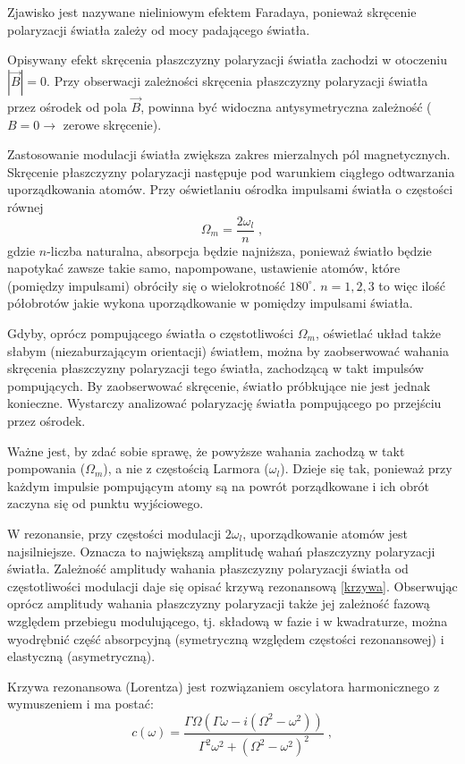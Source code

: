 \documentclass[a4paper,10pt]{article}
\begin{document}
Zjawisko jest nazywane nieliniowym efektem Faradaya, ponieważ skręcenie polaryzacji światła zależy od mocy padającego światła.

Opisywany efekt skręcenia płaszczyzny polaryzacji światła zachodzi w otoczeniu $|\vec B|=0$. Przy obserwacji zależności skręcenia płaszczyzny polaryzacji światła przez ośrodek od pola $\vec B$, powinna być widoczna antysymetryczna zależność ($B=0\rightarrow$ zerowe skręcenie).

 Zastosowanie modulacji światła zwiększa zakres mierzalnych pól magnetycznych. Skręcenie płaszczyzny polaryzacji następuje pod warunkiem ciągłego odtwarzania uporządkowania atomów. Przy oświetlaniu ośrodka impulsami światła o częstości równej
\begin{equation}
\Omega_m=\frac{2 \omega_l}{n} \; ,
\end{equation}
gdzie $n$-liczba naturalna, absorpcja będzie najniższa, ponieważ światło będzie napotykać zawsze takie samo, napompowane, ustawienie atomów, które (pomiędzy impulsami) obróciły się o wielokrotność $180^{\circ}$.  $n=1,2,3$ to więc ilość półobrotów jakie wykona uporządkowanie w pomiędzy impulsami światła.

Gdyby, oprócz pompującego światła o częstotliwości $\Omega_m$, oświetlać układ także słabym (niezaburzającym orientacji) światłem, można by zaobserwować wahania skręcenia płaszczyzny polaryzacji tego światła, zachodzącą w takt impulsów pompujących.
By zaobserwować skręcenie, światło próbkujące nie jest jednak konieczne. Wystarczy analizować polaryzację światła pompującego po przejściu przez ośrodek.


Ważne jest, by zdać sobie sprawę, że powyższe wahania zachodzą w takt pompowania ($\Omega_m$), a nie z częstością Larmora ($\omega_l$). Dzieje się tak, ponieważ przy każdym impulsie pompującym atomy są na powrót porządkowane i ich obrót zaczyna się od punktu wyjściowego.

W rezonansie, przy częstości modulacji $2 \omega_l$, uporządkowanie atomów jest najsilniejsze. Oznacza to największą amplitudę wahań płaszczyzny polaryzacji światła. Zależność amplitudy wahania płaszczyzny polaryzacji światła
od częstotliwości modulacji daje się opisać krzywą rezonansową \ref{krzywa}. Obserwując oprócz amplitudy wahania płaszczyzny polaryzacji także jej zależność fazową względem przebiegu modulującego, tj. składową w fazie i w kwadraturze, można wyodrębnić część absorpcyjną (symetryczną względem częstości rezonansowej) i elastyczną (asymetryczną).

Krzywa rezonansowa (Lorentza) jest rozwiązaniem oscylatora harmonicznego z wymuszeniem i ma postać:
\begin{equation}
c(\omega)=\frac{\Gamma  \Omega  \left(\Gamma  \omega -i \left(\Omega ^2-\omega ^2\right)\right)}{\Gamma ^2 \omega ^2+\left(\Omega ^2-\omega ^2\right)^2} \; ,
\label{krzywa}
\end{equation}
\end{document}
